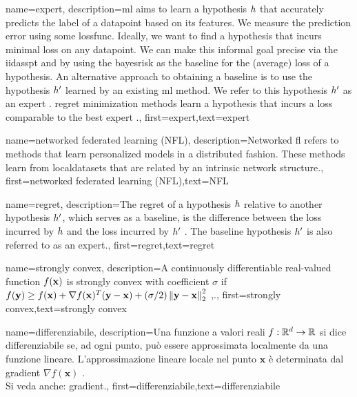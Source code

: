 {name={expert},
	description={\gls{ml} aims to learn a \gls{hypothesis} $h$ that accurately predicts the \gls{label} 
		of a \gls{datapoint} based on its \gls{feature}s. We measure the \gls{prediction} error using 
		some \gls{lossfunc}. Ideally, we want to find a \gls{hypothesis} that incurs minimal \gls{loss} 
		on any \gls{datapoint}. We can make this informal goal precise via the \gls{iidasspt} 
		and by using the \gls{bayesrisk} as the \gls{baseline} for the (average) \gls{loss} of a \gls{hypothesis}. 
		An alternative approach to obtaining a \gls{baseline} is to use the \gls{hypothesis} $h'$ learned 
		by an existing \gls{ml} method. We refer to this \gls{hypothesis} $h'$ as an expert \cite{PredictionLearningGames}. \Gls{regret} minimization methods learn a \gls{hypothesis}
		that incurs a \gls{loss} comparable to the best expert \cite{PredictionLearningGames,HazanOCO}.},
	first={expert},text={expert} 
}

{name={networked federated learning (NFL)},
	description={Networked \gls{fl} refers 
		to methods that learn personalized \gls{model}s in a distributed fashion. These methods learn from \gls{localdataset}s 
		that are related by an intrinsic network structure.},
 first={networked federated learning (NFL)},text={NFL} 
}




{name={regret},
	description={The regret of a \gls{hypothesis} $h$ relative to 
		another \gls{hypothesis} $h'$, which serves as a \gls{baseline}, 
		is the difference between the \gls{loss} incurred by $h$ and the \gls{loss} 
		incurred by $h'$ \cite{PredictionLearningGames}. 
		The \gls{baseline} \gls{hypothesis} $h'$ is also referred to as an \gls{expert}.},
	first={regret},text={regret} 
}

{name={strongly convex},
	description={A continuously \gls{differentiable} real-valued 
		function $f({\bf x})$ is strongly \gls{convex} with coefficient $\sigma$ if $f({\bf y}) \geq f({\bf x}) + \nabla f({\bf x})^{T} ({\bf y} - {\bf x}) + (\sigma/2) \left\Vert {{\bf y}- {\bf x}} \right\Vert_{2}^{2}$ \cite{nesterov04},\cite[Sec. B.1.1]{CvxAlgBertsekas}.},
	first={strongly convex},text={strongly convex} 
}

{name={differenziabile},
	description={Una funzione a valori reali $f: \mathbb{R}^{d} \rightarrow \mathbb{R}$ 
		si dice differenziabile se, ad ogni punto, può essere approssimata localmente da una funzione 
		lineare. L'approssimazione lineare locale nel punto $\mathbf{x}$ è determinata  
		dal \gls{gradient} $\nabla f ( \mathbf{x})$ \cite{RudinBookPrinciplesMatheAnalysis}.
		\\ 
		Si veda anche: \gls{gradient}.},
	first={differenziabile},text={differenziabile} 
}

